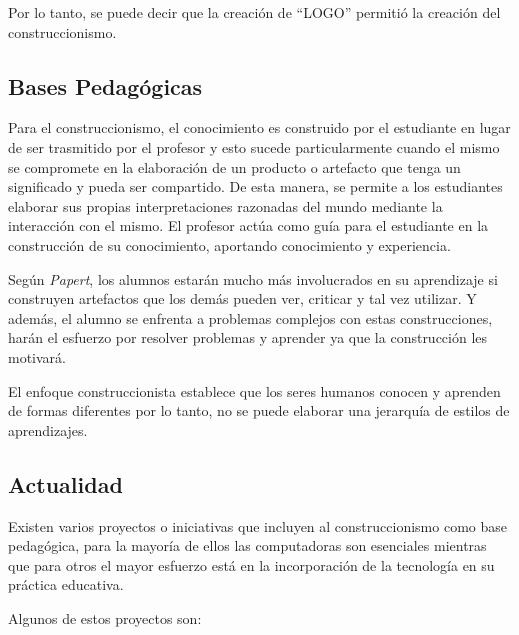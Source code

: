 Por lo tanto, se puede decir que la creación de \enquote{LOGO} permitió la
creación del construccionismo\cite{historia:2014}.

\subsection{Bases Pedagógicas}

Para el construccionismo, el conocimiento es construido por el estudiante en
lugar de ser trasmitido por el profesor\cite{moses:2003} y esto sucede
particularmente cuando el mismo se compromete en la elaboración de un producto o
artefacto que tenga un significado y pueda ser compartido\cite{valdivia:sg}. De
esta manera, se permite a los estudiantes elaborar sus propias interpretaciones
razonadas del mundo mediante la interacción con el mismo. El profesor actúa como
guía para el estudiante en la construcción de su conocimiento, aportando
conocimiento y experiencia.

Según \textit{Papert}, los alumnos estarán mucho más involucrados en su aprendizaje si
construyen artefactos que los demás pueden ver, criticar y tal vez utilizar. Y
además, el alumno se enfrenta a problemas complejos con estas construcciones,
harán el esfuerzo por resolver problemas y aprender ya que la construcción les
motivará\cite{const:vs}.

El enfoque construccionista establece que los seres humanos conocen y aprenden
de formas diferentes por lo tanto, no se puede elaborar una jerarquía de estilos
de aprendizajes\cite{valdivia:sg}.

\subsection{Actualidad}

Existen varios proyectos o iniciativas que incluyen al construccionismo como
base pedagógica, para la mayoría de ellos las computadoras son esenciales
mientras que para otros el mayor esfuerzo está en la incorporación de la
tecnología en su práctica educativa\cite{papertian:const}.

Algunos de estos proyectos son:


